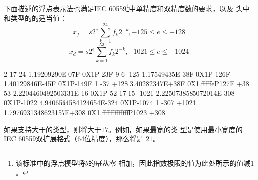 \paragraph{}
\ex 下面描述的浮点表示法也满足IEC 60559\footnote{该标准中的浮点模型将$b$的幂从零
相加，因此指数极限的值为此处所示的值减$1$。}中单精度和双精度数的要求，以及
头中和类型的的适当值：
\begin{equation*}
  x_f = s2^e\sum_{k=1}^{24} f_k 2^{-k}, -125 \le e \le +128
\end{equation*}
\begin{equation*}
  x_d = s2^e\sum_{k=1}^{53} f_k 2^{-k}, -1021 \le e \le +1024
\end{equation*}
\begin{itemize}
           {2}
         {17}
       {24}
         {1.19209290E-07F}
         {0X1P-23F}
    {9}
             {6}
        {-125}
             {1.17549435E-38F}
             {0X1P-126F}
       {1.40129846E-45F}
       {0X1P-149F}
    {1}
    {-37}
        {+128}
             {3.40282347E+38F}
             {0X1.fffffeP127F}
    {+38}
       {53}
         {2.2204460492503131E-16}
         {0X1P-52}
    {17}
             {15}
        {-1021}
             {2.2250738585072014E-308}
             {0X1P-1022}
       {4.9406564584124654E-324}
       {0X1P-1074}
    {1}
    {-307}
        {+1024}
             {1.7976931348623157E+308}
             {0X1.fffffffffffffP1023}
    {+308}
\end{itemize}
如果支持大于的类型，则将大于$17$。例如，如果最宽的类
型是使用最小宽度的IEC 60559双扩展格式（64位精度），那么将是
$21$。

